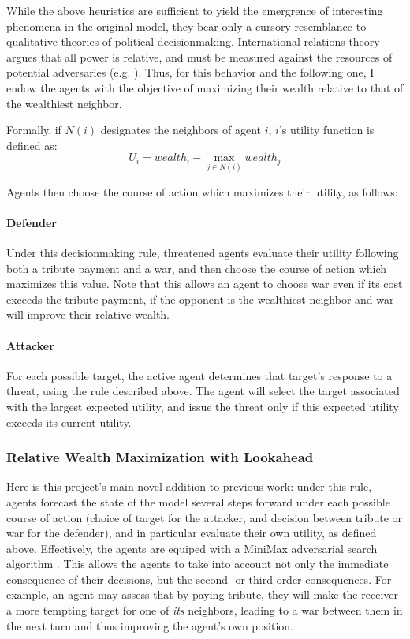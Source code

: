 \documentclass{article}
\begin{document}
While the above heuristics are sufficient to yield the emergrence of interesting phenomena in the original model, they bear only a cursory resemblance to qualitative theories of political decisionmaking. International relations theory argues that all power is relative, and must be measured against the resources of potential adversaries (e.g. \citet{waltz_2010}). Thus, for this behavior and the following one, I endow the agents with the objective of maximizing their wealth relative to that of the wealthiest neighbor. 

Formally, if $N(i)$ designates the neighbors of agent $i$, $i$'s utility function is defined as:
\begin{equation}
U_i=wealth_i-\operatorname*{max}_{j\in N(i)}wealth_j
\end{equation}

Agents then choose the course of action which maximizes their utility, as follows:

\paragraph{Defender}
Under this decisionmaking rule, threatened agents evaluate their utility following both a tribute payment and a war, and then choose the course of action which maximizes this value. Note that this allows an agent to choose war even if its cost exceeds the tribute payment, if the opponent is the wealthiest neighbor and war will improve their relative wealth.

\paragraph{Attacker}
For each possible target, the active agent determines that target's response to a threat, using the rule described above. The agent will select the target associated with the largest expected utility, and issue the threat only if this expected utility exceeds its current utility.

\subsubsection{Relative Wealth Maximization with Lookahead}

Here is this project's main novel addition to previous work: under this rule, agents forecast the state of the model several steps forward under each possible course of action (choice of target for the attacker, and decision between tribute or war for the defender), and in particular evaluate their own utility, as defined above. Effectively, the agents are equiped with a MiniMax adversarial search algorithm \citep{russel_2009}. This allows the agents to take into account not only the immediate consequence of their decisions, but the second- or third-order consequences. For example, an agent may assess that by paying tribute, they will make the receiver a more tempting target for one of \emph{its} neighbors, leading to a war between them in the next turn and thus improving the agent's own position.
\end{document}
